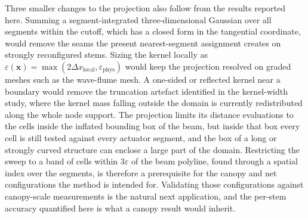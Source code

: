 \noindent
Three smaller changes to the projection also follow from the results reported here. Summing a segment-integrated three-dimensional Gaussian over all segments within the cutoff, which has a closed form in the tangential coordinate, would remove the seams the present nearest-segment assignment creates on strongly reconfigured stems. Sizing the kernel locally as $\varepsilon(\mathbf{x}) = \max(2\Delta x_{\mathrm{local}}, \varepsilon_{\mathrm{phys}})$ would keep the projection resolved on graded meshes such as the wave-flume mesh. A one-sided or reflected kernel near a boundary would remove the truncation artefact identified in the kernel-width study, where the kernel mass falling outside the domain is currently redistributed along the whole node support. The projection limits its distance evaluations to the cells inside the inflated bounding box of the beam, but inside that box every cell is still tested against every actuator segment, and the box of a long or strongly curved structure can enclose a large part of the domain. Restricting the sweep to a band of cells within $3\varepsilon$ of the beam polyline, found through a spatial index over the segments, is therefore a prerequisite for the canopy and net configurations the method is intended for. Validating those configurations against canopy-scale measurements is the natural next application, and the per-stem accuracy quantified here is what a canopy result would inherit.
